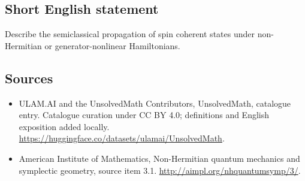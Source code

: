 \documentclass[11pt]{article}
\begin{document}
\subsection{Short English statement}
Describe the semiclassical propagation of spin coherent states under non-Hermitian or generator-nonlinear Hamiltonians.
\subsection{Sources}
\begin{itemize}
\item[\hypertarget{source:statement:1}{S1}] ULAM.AI and the UnsolvedMath Contributors, UnsolvedMath, catalogue entry. Catalogue curation under CC BY 4.0; definitions and English exposition added locally.
\url{https://huggingface.co/datasets/ulamai/UnsolvedMath}.
\item[\hypertarget{source:statement:2}{S2}] American Institute of Mathematics, Non-Hermitian quantum mechanics and symplectic geometry, source item 3.1.
\url{http://aimpl.org/nhquantumsymp/3/}.
\end{itemize}
\label{end:statement}
\end{document}
